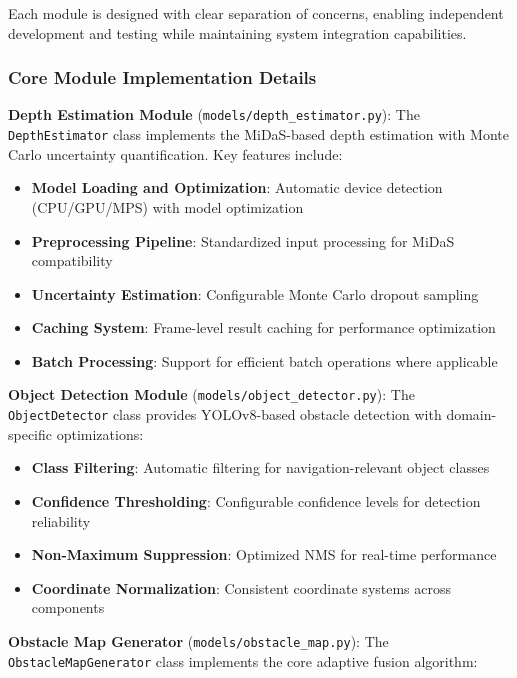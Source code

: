 \documentclass[12pt,oneside]{book}
\begin{document}
Each module is designed with clear separation of concerns, enabling independent development and testing while maintaining system integration capabilities.

\subsubsection{Core Module Implementation Details}

\textbf{Depth Estimation Module} (\texttt{models/depth\_estimator.py}):
The \texttt{DepthEstimator} class implements the MiDaS-based depth estimation with Monte Carlo uncertainty quantification. Key features include:

\begin{itemize}
\item \textbf{Model Loading and Optimization}: Automatic device detection (CPU/GPU/MPS) with model optimization
\item \textbf{Preprocessing Pipeline}: Standardized input processing for MiDaS compatibility
\item \textbf{Uncertainty Estimation}: Configurable Monte Carlo dropout sampling
\item \textbf{Caching System}: Frame-level result caching for performance optimization
\item \textbf{Batch Processing}: Support for efficient batch operations where applicable
\end{itemize}

\textbf{Object Detection Module} (\texttt{models/object\_detector.py}):
The \texttt{ObjectDetector} class provides YOLOv8-based obstacle detection with domain-specific optimizations:

\begin{itemize}
\item \textbf{Class Filtering}: Automatic filtering for navigation-relevant object classes
\item \textbf{Confidence Thresholding}: Configurable confidence levels for detection reliability
\item \textbf{Non-Maximum Suppression}: Optimized NMS for real-time performance
\item \textbf{Coordinate Normalization}: Consistent coordinate systems across components
\end{itemize}

\textbf{Obstacle Map Generator} (\texttt{models/obstacle\_map.py}):
The \texttt{ObstacleMapGenerator} class implements the core adaptive fusion algorithm:
\end{document}
